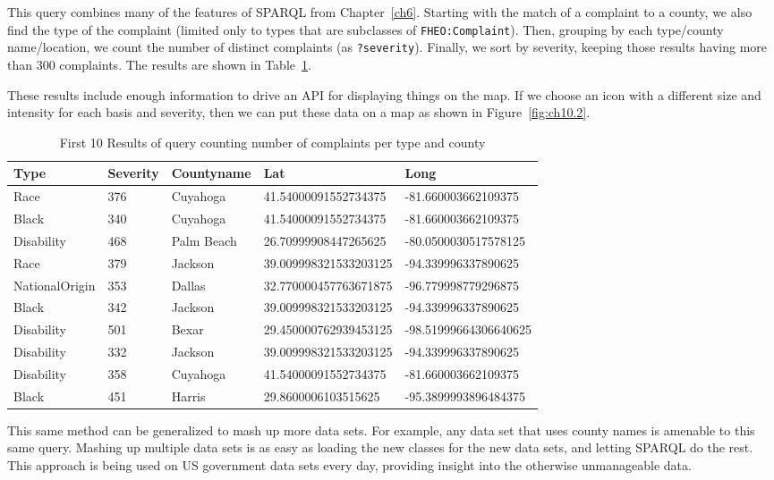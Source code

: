 This query combines many of the features of SPARQL from Chapter~\ref{ch6}.
Starting with the match of a complaint to a county, we also find the
type of the complaint (limited only to types that are subclasses of
\texttt{FHEO:Complaint}). Then, grouping by each type/county name/location, we count the
number of distinct complaints (as \texttt{?severity}). Finally, we sort by
severity, keeping those results having more than 300 complaints. The
results are shown in Table~\ref{tab:ch10.2}.

These results include enough information to drive an API for displaying
things on the map. If we choose an icon with a different size and
intensity for each basis and severity, then we can put these data on a
map as shown in Figure~\ref{fig:ch10.2}.

\begin{table}
\caption{First 10 Results of query counting number of complaints per type and county}
\label{tab:ch10.2}
\begin{tabular}{|lllll|}
\hline
Type&Severity&Countyname&Lat&Long\\
\hline
Race&376&Cuyahoga&41.54000091552734375&-81.660003662109375\\
Black&340&Cuyahoga&41.54000091552734375&-81.660003662109375\\
Disability&468&Palm Beach&26.70999908447265625&-80.0500030517578125\\
Race&379&Jackson&39.009998321533203125&-94.339996337890625\\
NationalOrigin&353&Dallas&32.770000457763671875&-96.779998779296875\\
Black&342&Jackson&39.009998321533203125&-94.339996337890625\\
Disability&501&Bexar&29.450000762939453125&-98.51999664306640625\\
Disability&332&Jackson&39.009998321533203125&-94.339996337890625\\
Disability&358&Cuyahoga&41.54000091552734375&-81.660003662109375\\
Black&451&Harris&29.8600006103515625&-95.3899993896484375\\
\hline
\end{tabular}
\end{table}


This same method can be generalized to mash up more data sets. For
example, any data set that uses county names is amenable to this same
query. Mashing up multiple data sets is as easy as loading the new
classes for the new data sets, and letting SPARQL do the rest. This
approach is being used on US government data sets every day, providing
insight into the otherwise unmanageable data.

